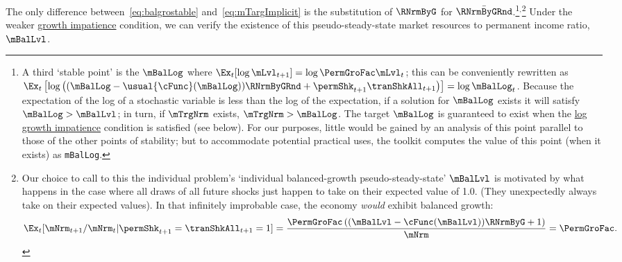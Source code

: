 \documentclass[BufferStockTheory]{subfiles}
\begin{document}
The only difference between~\eqref{eq:balgrostable} and~\eqref{eq:mTargImplicit} is the substitution of $\RNrmByG$ for $\bar{\RNrmByGRnd}$.\footnote{A third `stable point' is the $\mBalLog$ where $\Ex_{t}[\log \mLvl_{t+1}] = \log \PermGroFac \mLvl_{t}$; this can be conveniently rewritten as $\Ex_{t}\left[\log\left((\mBalLog-\usual{\cFunc}(\mBalLog))\RNrmByGRnd+\permShk_{t+1}\tranShkAll_{t+1}\right)\right]  = \log \mBalLog_{t}$.
Because the expectation of the log of a stochastic variable is less than the log of the expectation, if a solution for $\mBalLog$ exists it will satisfy $\mBalLog > \mBalLvl$; in turn, if $\mTrgNrm$ exists, $\mTrgNrm>\mBalLog$.
The target $\mBalLog$ is guaranteed to exist when the \hyperlink{GICSdl}{log growth impatience} condition is satisfied (see below).
For our purposes, little would be gained by an analysis of this point parallel to those of the other points of stability; but to accommodate potential practical uses,  the {\ARKurl} toolkit computes the value of this point (when it exists) as \texttt{mBalLog}.}$^{,}$\footnote{Our choice to call to this the individual problem's `individual balanced-growth pseudo-steady-state' $\mBalLvl$ is motivated by what happens in the case where all draws of all future shocks just happen to take on their expected value of 1.0.
(They unexpectedly always take on their expected values).
In that infinitely improbable case, the economy \textit{would} exhibit balanced growth:
  \begin{equation}\begin{gathered}\begin{aligned}
    \Ex_{t}[\mNrm_{t+1}/\mNrm_{t}|\permShk_{t+1}=\tranShkAll_{t+1}=1] = \frac{\PermGroFac \left((\mBalLvl-\cFunc(\mBalLvl))\RNrmByG + 1 \right)}{\mNrm} = \PermGroFac.
  \end{aligned}\end{gathered}\end{equation}}
Under the weaker  \hyperlink{GIC}{growth impatience} condition, we can verify the existence of this pseudo-steady-state market resources to permanent income ratio, $\mBalLvl$.
\end{document}
